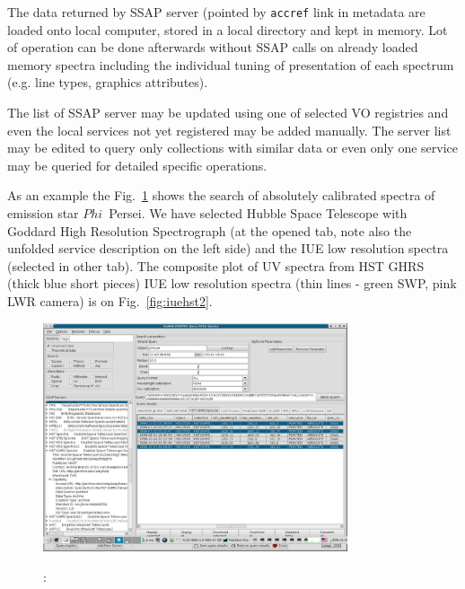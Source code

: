 \documentclass[final,authoryear,5p,times,twocolumn]{elsarticle}
\begin{document}
The data returned by SSAP server (pointed by {\tt accref} link in metadata are
loaded onto local computer, stored in a local directory  and kept in memory.
Lot of operation can be done afterwards without SSAP calls on already loaded
memory spectra including the individual tuning of presentation of each
spectrum (e.g. line types, graphics attributes).

The list of SSAP server may be updated using one of selected VO registries and even the local
services not yet registered may be added manually. The server list may be
edited to query only collections with similar data or even only one service
may be queried for detailed specific operations.

As an  example the  Fig.~\ref{fig:hst_query} shows the search of absolutely
calibrated spectra of  emission star $Phi$~Persei. We have selected Hubble
Space Telescope with Goddard High Resolution Spectrograph (at the opened tab, note
also the unfolded service description on the left side) and the IUE low resolution spectra (selected in other tab).
The  composite plot of UV spectra from HST GHRS (thick blue short pieces) IUE low resolution
spectra (thin lines - green SWP, pink LWR camera) is on Fig.~\ref{fig:iuehst2}.

\begin{figure}[Ht]
\begin{center}
\includegraphics[width=0.8\textwidth]{hst_query.pdf}
\caption{}
\label{fig:hst_query}
:
\end{center}
\end{figure}
\end{document}
